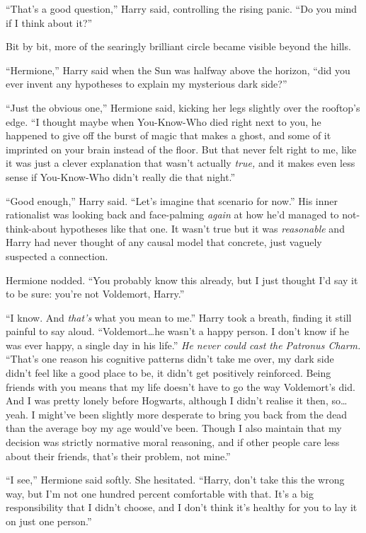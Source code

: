 “That’s a good question,” Harry said, controlling the rising panic. “Do you mind if I think about it?”

Bit by bit, more of the searingly brilliant circle became visible beyond the hills.

“Hermione,” Harry said when the Sun was halfway above the horizon, “did you ever invent any hypotheses to explain my mysterious dark side?”

“Just the obvious one,” Hermione said, kicking her legs slightly over the rooftop’s edge. “I thought maybe when You-Know-Who died right next to you, he happened to give off the burst of magic that makes a ghost, and some of it imprinted on your brain instead of the floor. But that never felt right to me, like it was just a clever explanation that wasn’t actually \emph{true,} and it makes even less sense if You-Know-Who didn’t really die that night.”

“Good enough,” Harry said. “Let’s imagine that scenario for now.” His inner rationalist was looking back and face-palming \emph{again} at how he’d managed to not-think-about hypotheses like that one. It wasn’t true but it was \emph{reasonable} and Harry had never thought of any causal model that concrete, just vaguely suspected a connection.

Hermione nodded. “You probably know this already, but I just thought I’d say it to be sure: you’re not Voldemort, Harry.”

“I know. And \emph{that’s} what you mean to me.” Harry took a breath, finding it still painful to say aloud. “Voldemort…he wasn’t a happy person. I don’t know if he was ever happy, a single day in his life.” \emph{He never could cast the Patronus Charm.} “That’s one reason his cognitive patterns didn’t take me over, my dark side didn’t feel like a good place to be, it didn’t get positively reinforced. Being friends with you means that my life doesn’t have to go the way Voldemort’s did. And I was pretty lonely before Hogwarts, although I didn’t realise it then, so…yeah. I might’ve been slightly more desperate to bring you back from the dead than the average boy my age would’ve been. Though I also maintain that my decision was strictly normative moral reasoning, and if other people care less about their friends, that’s their problem, not mine.”

“I see,” Hermione said softly. She hesitated. “Harry, don’t take this the wrong way, but I’m not one hundred percent comfortable with that. It’s a big responsibility that I didn’t choose, and I don’t think it’s healthy for you to lay it on just one person.”

